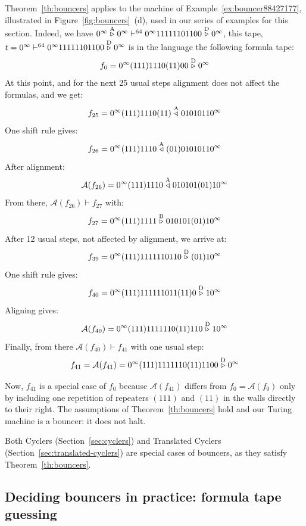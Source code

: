 \begin{example}\label{ex:bouncerTheory}
    Theorem~\ref{th:bouncers} applies to the machine of Example~\ref{ex:bouncer88427177}, illustrated in Figure~\ref{fig:bouncers}~(d), used in our series of examples for this section. Indeed, we have $0^\infty \stackrel{\text{A}}\triangleright 0^\infty \vdash^{64} 0^\infty 11111101100 \stackrel{\text{D}}\triangleright 0^\infty$, this tape, $t=0^\infty \vdash^{64} 0^\infty 11111101100 \stackrel{\text{D}}\triangleright 0^\infty$ is in the language the following formula tape:
    $$f_0 = 0^\infty (111)1110(11)00\stackrel{\text{D}}\triangleright0^\infty$$
    At this point, and for the next 25 usual steps alignment does not affect the formulas, and we get: $$f_{25} = 0^\infty (111) 1110 (11) \stackrel{\text{A}}\triangleleft 01010110^\infty$$
    One shift rule gives:
    $$ f_{26} = 0^\infty (111) 1110  \stackrel{\text{A}}\triangleleft (01) 01010110^\infty$$
    After alignment:
    $$ \mathcal{A}(f_{26}) = 0^\infty (111) 1110  \stackrel{\text{A}}\triangleleft 010101(01)10^\infty$$
    From there, $\mathcal{A}(f_{26}) \vdash f_{27}$ with:
    $$ f_{27} = 0^\infty (111) 1111  \stackrel{\text{B}}\triangleright 010101(01)10^\infty$$
    After 12 usual steps, not affected by alignment, we arrive at:
    $$f_{39} = 0^\infty (111)1111110110\stackrel{\text{D}}\triangleright(01)10^\infty$$
    One shift rule gives:
    $$f_{40} = 0^\infty (111)111111011(11)0\stackrel{\text{D}}\triangleright10^\infty$$
    Aligning gives:
    $$\mathcal{A}(f_{40}) = 0^\infty (111)1111110(11)110\stackrel{\text{D}}\triangleright10^\infty$$
    Finally, from there $\mathcal{A}(f_{40}) \vdash f_{41}$ with one usual step:
    $$f_{41} =\mathcal{A}(f_{41}) = 0^\infty (111)1111110(11)1100\stackrel{\text{D}}\triangleright0^\infty$$

    Now, $f_{41}$ is a special case of $f_{0}$ because $\mathcal{A}(f_{41})$ differs from $f_0=\mathcal{A}(f_0)$ only by including one repetition of repeaters $(111)$ and $(11)$ in the walls directly to their right. The assumptions of Theorem~\ref{th:bouncers} hold and our Turing machine is a bouncer: it does not halt.
\end{example}

\begin{remark}
    Both Cyclers (Section~\ref{sec:cyclers}) and Translated Cyclers (Section~\ref{sec:translated-cyclers}) are special cases of bouncers, as they satisfy Theorem~\ref{th:bouncers}.
\end{remark}


\subsection{Deciding bouncers in practice: formula tape guessing}

